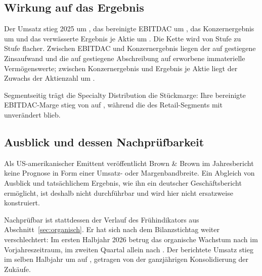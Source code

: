 \subsection{Wirkung auf das Ergebnis}

Der Umsatz stieg 2025 um \Pct{\UmsatzDelta}, das bereinigte EBITDAC um
\Pct{\EBITDACberDelta}, das Konzernergebnis um
\Pct{\ErgebnisDelta} und das verw\"asserte Ergebnis je Aktie um
\Pct{\EPSdilDelta}. Die Kette wird von Stufe zu Stufe
flacher. Zwischen EBITDAC und Konzernergebnis liegen der auf
\MioUSDexakt{\Zinsaufwand} gestiegene Zinsaufwand und die auf
\MioUSDexakt{\AbschrImmat} gestiegene Abschreibung auf erworbene
immaterielle Verm\"ogenswerte; zwischen Konzernergebnis und Ergebnis je
Aktie liegt der Zuwachs der Aktienzahl um \Pct{\AktienZuwachs}.

Segmentseitig tr\"agt die Specialty Distribution die St\"uckmarge: Ihre
bereinigte EBITDAC-Marge stieg von  auf
, w\"ahrend die des Retail-Segments mit
 unver\"andert blieb.

\subsection{Ausblick und dessen Nachpr\"ufbarkeit}
\label{sec:ausblick}

Als US-amerikanischer Emittent ver\"offentlicht Brown \& Brown im
Jahresbericht keine Prognose in Form einer Umsatz- oder Margenbandbreite.
Ein Abgleich von Ausblick und tats\"achlichem Ergebnis, wie ihn ein
deutscher Gesch\"aftsbericht erm\"oglicht, ist deshalb nicht durchf\"uhrbar
und wird hier nicht ersatzweise konstruiert.

Nachpr\"ufbar ist stattdessen der Verlauf des Fr\"uhindikators aus
Abschnitt~\ref{sec:organisch}. Er hat sich nach dem Bilanzstichtag weiter
verschlechtert: Im ersten Halbjahr 2026 betrug das organische Wachstum
\Pct{\HJOrganisch} nach \Pct{\HJOrganischVJ} im Vorjahreszeitraum, im
zweiten Quartal allein \Pct{\QzweiOrganisch} nach
\Pct{\QzweiOrganischVJ}.
Der berichtete Umsatz stieg im selben Halbjahr um \Pct{\HJUmsatzDelta} auf
\MioUSDexakt{\HJUmsatz}, getragen von der ganzj\"ahrigen Konsolidierung der
Zuk\"aufe.
